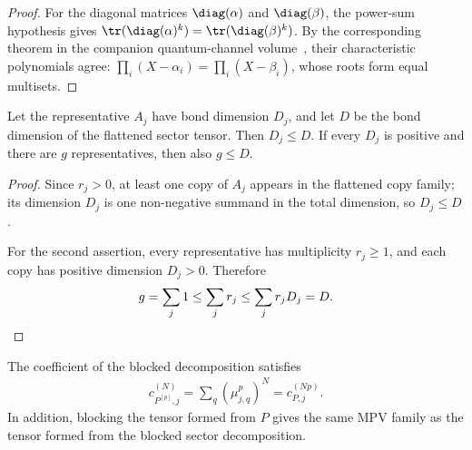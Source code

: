 \begin{proof}
    \leanok
    For the diagonal matrices $\diag(\alpha)$ and $\diag(\beta)$, the
    power-sum hypothesis gives $\tr(\diag(\alpha)^k) = \tr(\diag(\beta)^k)$.
    By the corresponding theorem in the companion quantum-channel volume~\cite[``Newton--Girard trace recursion'']{QICLean2026Blueprint}, their characteristic
    polynomials agree: $\prod_i (X - \alpha_i) = \prod_i (X - \beta_i)$, whose
    roots form equal multisets.
\end{proof}

\begin{lemma}
    \label{thm:sector_basis_dimension_le_total_dimension}
    \leanok
    Let the representative $A_j$ have bond dimension $D_j$, and let $D$ be
    the bond dimension of the flattened sector tensor. Then $D_j\leq D$.
    If every $D_j$ is positive and there are $g$ representatives, then also
    $g\leq D$.
\end{lemma}

\begin{proof}
    \leanok
    Since $r_j>0$, at least one copy of $A_j$ appears in the flattened copy
    family; its dimension $D_j$ is one non-negative summand in the total
    dimension, so $D_j\leq D$.

    For the second assertion, every representative has multiplicity
    $r_j\geq1$, and each copy has positive dimension $D_j>0$. Therefore
    \begin{align}
        g=\sum_j1
        \leq\sum_j r_j
        \leq\sum_j r_jD_j
        =D.
        \notag
    \end{align}
\end{proof}

\begin{lemma}%
    \label{thm:sector_decomposition_block_tensor_mpv}
    \leanok
    The coefficient of the blocked decomposition satisfies
    \begin{align}
        c_{P^{[p]},j}^{(N)}
        =\sum_q(\mu_{j,q}^{p})^N
        =c_{P,j}^{(Np)}.
        \label{eq:bnt_sector_block_coeff}
    \end{align}
    In addition, blocking the tensor formed from $P$ gives the same MPV family
    as the tensor formed from the blocked sector decomposition.
\end{lemma}

